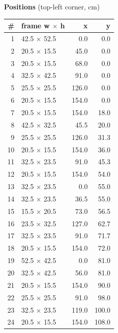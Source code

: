 \documentclass[a4paper,landscape,10pt]{article}
\begin{document}
\begin{minipage}[t]{0.25\textwidth}
\vspace{8pt}
{\bfseries Positions} (top-left corner, cm)\\[2pt]
\tiny
\begin{tabular}{@{}r l r r@{}}
\toprule
\# & frame w $\times$ h & x & y \\
\midrule
1 & 42.5 $\times$ 52.5 & 0.0 & 0.0 \\
2 & 20.5 $\times$ 15.5 & 45.0 & 0.0 \\
3 & 20.5 $\times$ 15.5 & 68.0 & 0.0 \\
4 & 32.5 $\times$ 42.5 & 91.0 & 0.0 \\
5 & 25.5 $\times$ 25.5 & 126.0 & 0.0 \\
6 & 20.5 $\times$ 15.5 & 154.0 & 0.0 \\
7 & 20.5 $\times$ 15.5 & 154.0 & 18.0 \\
8 & 42.5 $\times$ 32.5 & 45.5 & 20.0 \\
9 & 25.5 $\times$ 25.5 & 126.0 & 31.3 \\
10 & 20.5 $\times$ 15.5 & 154.0 & 36.0 \\
11 & 32.5 $\times$ 23.5 & 91.0 & 45.3 \\
12 & 20.5 $\times$ 15.5 & 154.0 & 54.0 \\
13 & 32.5 $\times$ 23.5 & 0.0 & 55.0 \\
14 & 32.5 $\times$ 23.5 & 36.5 & 55.0 \\
15 & 15.5 $\times$ 20.5 & 73.0 & 56.5 \\
16 & 23.5 $\times$ 32.5 & 127.0 & 62.7 \\
17 & 32.5 $\times$ 23.5 & 91.0 & 71.7 \\
18 & 20.5 $\times$ 15.5 & 154.0 & 72.0 \\
19 & 52.5 $\times$ 42.5 & 0.0 & 81.0 \\
20 & 32.5 $\times$ 42.5 & 56.0 & 81.0 \\
21 & 20.5 $\times$ 15.5 & 154.0 & 90.0 \\
22 & 25.5 $\times$ 25.5 & 91.0 & 98.0 \\
23 & 32.5 $\times$ 23.5 & 119.0 & 100.0 \\
24 & 20.5 $\times$ 15.5 & 154.0 & 108.0 \\
\bottomrule
\end{tabular}
\end{minipage}
\clearpage
\end{document}
